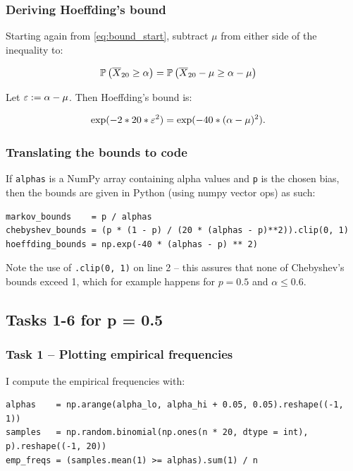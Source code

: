 \subsubsection{Deriving Hoeffding's bound}

Starting again from \cref{eq:bound_start}, subtract $\mu$ from either side of
the inequality to:

\begin{align*}
  \mathbb P \left(\overline{X}_{20} \geq \alpha\right) &= \mathbb P \left(\overline{X}_{20} -\mu \geq \alpha - \mu\right)
\end{align*}

Let $\varepsilon := \alpha - \mu$. Then Hoeffding's bound is:

\begin{align*}
  \text{exp}(-2 * 20 * \varepsilon^2) &= \text{exp}(-40 * (\alpha - \mu)^2).
\end{align*}


\subsubsection{Translating the bounds to code}

If \texttt{alphas} is a NumPy array containing alpha values and \texttt{p} is the
chosen bias, then the bounds are given in Python (using numpy vector ops) as such:

\begin{verbatim}
markov_bounds    = p / alphas
chebyshev_bounds = (p * (1 - p) / (20 * (alphas - p)**2)).clip(0, 1)
hoeffding_bounds = np.exp(-40 * (alphas - p) ** 2)
\end{verbatim}

Note the use of \texttt{.clip(0, 1)} on line 2 -- this assures that none of
Chebyshev's bounds exceed 1, which for example happens for $p = 0.5$ and $\alpha
\leq 0.6$.


\subsection{Tasks 1-6 for p = 0.5}
\subsubsection{Task 1 -- Plotting empirical frequencies}
\label{sec:task_1}

I compute the empirical frequencies with:

\begin{verbatim}
alphas    = np.arange(alpha_lo, alpha_hi + 0.05, 0.05).reshape((-1, 1))
samples   = np.random.binomial(np.ones(n * 20, dtype = int), p).reshape((-1, 20))
emp_freqs = (samples.mean(1) >= alphas).sum(1) / n
\end{verbatim}

